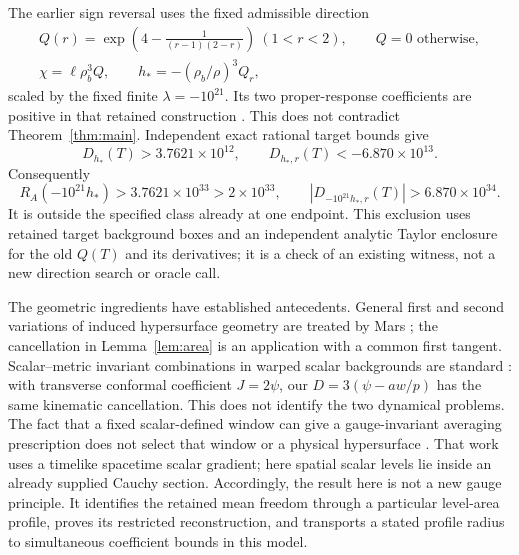 \documentclass[11pt]{article}
\begin{document}
The earlier sign reversal uses the fixed admissible direction
\begin{equation}
 \begin{gathered}
 Q(r)=\exp\!\left(4-\frac1{(r-1)(2-r)}\right)\ (1<r<2),
 \qquad Q=0\text{ otherwise},\\
 \chi=\ell\rho_b^3Q,\qquad
 h_*=-\left(\rho_b/\rho\right)^3Q_r,
 \end{gathered}
 \label{eq:witness}
\end{equation}
scaled by the fixed finite $\lambda=-10^{21}$. Its two proper-response
coefficients are positive in that retained construction
\cite{preparation}. This does not contradict Theorem~\ref{thm:main}.
Independent exact rational target bounds give
\begin{equation}
 D_{h_*}(T)>3.7621\times10^{12},\qquad
 D_{h_*,r}(T)<-6.870\times10^{13}.
 \label{eq:witnessbounds}
\end{equation}
Consequently
\begin{equation}
 R_A(-10^{21}h_*)>3.7621\times10^{33}>2\times10^{33},\qquad
 |D_{-10^{21}h_*,r}(T)|>6.870\times10^{34}.
 \label{eq:excluded}
\end{equation}
It is outside the specified class already at one endpoint. This exclusion
uses retained target background boxes and an independent analytic Taylor
enclosure for the old $Q(T)$ and its derivatives; it is a check of an
existing witness, not a new direction search or oracle call.

The geometric ingredients have established antecedents. General first
and second variations of induced hypersurface geometry are treated by
Mars \cite[Secs.~3, 6--7]{Mars}; the cancellation in
Lemma~\ref{lem:area} is an application with a common first tangent.
Scalar--metric invariant combinations in warped scalar backgrounds are
standard \cite[Secs.~III--IV]{Giovannini}: with transverse conformal
coefficient $J=2\psi$, our $D=3(\psi-aw/p)$ has the same kinematic
cancellation. This does not identify the two dynamical problems.
The fact that a fixed scalar-defined window can give a gauge-invariant
averaging prescription does not select that window or a physical
hypersurface \cite[Sec.~3, Eq.~(3.23), and Sec.~4]{Gasperini}.
That work uses a timelike spacetime scalar gradient; here spatial scalar
levels lie inside an already supplied Cauchy section. Accordingly, the result
here is not a new gauge principle. It identifies the retained mean
freedom through a particular level-area profile, proves its restricted
reconstruction, and transports a stated profile radius to simultaneous
coefficient bounds in this model.
\end{document}
